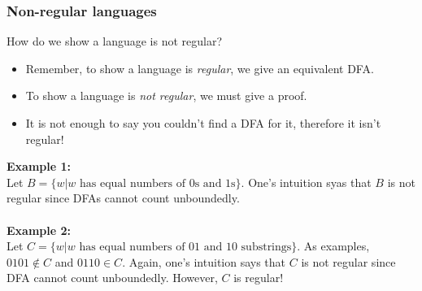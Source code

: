 \documentclass[11pt]{article}
\begin{document}
\subsubsection{Non-regular languages}
How do we show a language is not regular?
\begin{itemize}
    \item Remember, to show a language is \textit{regular}, we give an equivalent DFA.
    \item To show a language is \textit{not regular}, we must give a proof.
    \item It is not enough to say you couldn't find a DFA for it, therefore it isn't regular!
\end{itemize}
\textbf{Example 1:}\\
Let $B=\{w|w\text{ has equal numbers of 0s and 1s}\}$. One's intuition syas that $B$ is not regular since DFAs cannot count unboundedly.
\\\\
\textbf{Example 2:}\\
Let $C=\{w|w\text{ has equal numbers of 01 and 10 substrings}\}$. As examples, $0101\not\in C$ and $0110\in C$.
Again, one's intuition says that $C$ is not regular since DFA cannot count unboundedly.
However, $C$ is regular!
\end{document}
